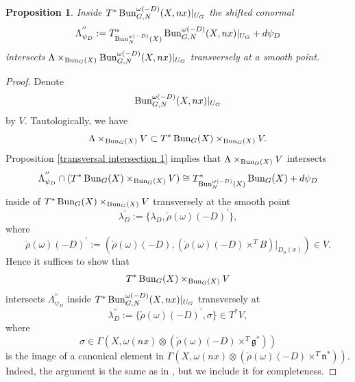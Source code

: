 \documentclass[9pt]{amsart}
\newtheorem{pr}[subsubsection]{Proposition}
\numberwithin{equation}{section}
\begin{document}
\begin{pr}\label{transversal intersection 2}
	Inside $T^*\operatorname{{Bun}}_{G, N}^{\omega(-D)}(X, nx)|_{U_G}$ the shifted conormal $$\Lambda^{''}_{\psi_D}:=T^*_{\operatorname{{Bun}}_N^{\omega(-D)}(X)} \operatorname{{Bun}}_{G, N}^{\omega(-D)}(X, nx)|_{U_G}+ d\psi_D$$
	intersects $\Lambda \times_{\operatorname{{Bun}}_G(X)} \operatorname{{Bun}}_{G, N}^{\omega(-D)}(X, nx)|_{U_G}$ transversely at a smooth point.
\end{pr}

\begin{proof}
	Denote $$\operatorname{{Bun}}_{G, N}^{\omega(-D)}(X, nx)|_{U_G}$$ by $V$. Tautologically, we have 
	$$\Lambda \times_{\operatorname{{Bun}}_G(X)}V \subset T^*\operatorname{{Bun}}_G(X) \times_{\operatorname{{Bun}}_G(X)} V.$$
	Proposition \ref{transversal intersection 1} implies that $\Lambda \times_{\operatorname{{Bun}}_G(X)} V$ intersects 
	$$\Lambda^{''}_{\psi_D} \cap (T^*\operatorname{{Bun}}_G(X) \times_{\operatorname{{Bun}}_G(X)} V) \cong T^*_{\operatorname{{Bun}}_N^{\omega(-D)}(X)} \operatorname{{Bun}}_{G}(X) + d\psi_D$$
	inside of $T^*\operatorname{{Bun}}_G(X) \times_{\operatorname{{Bun}}_G(X)} V$ transversely at the smooth point $$\lambda_D^{\prime}:= \{\lambda_D, \check{\rho}(\omega)(-D)^{\prime}\},$$
	where $$\check{\rho}(\omega)(-D)^{\prime}:=(\check{\rho}(\omega)(-D), (\check{\rho}(\omega)(-D)\times^T B) |_{D_n(x)}) \in V.$$Hence it suffices to show that $$T^*\operatorname{{Bun}}_G(X) \times_{\operatorname{{Bun}}_G(X)} V$$ intersects $\Lambda^{''}_{\psi_D}$ inside $T^*\operatorname{{Bun}}_{G, N}^{\omega(-D)}(X, nx)|_{U_G}$ transversely at 
	$$\lambda_D^{''}:= \{\check{\rho}(\omega)(-D)^{\prime}, \sigma\} \in  T^*V,$$
	where $$\sigma \in \Gamma(X, \omega(nx) \otimes (\check{\rho}(\omega)(-D) \times^T \mathfrak{g}^*))$$ is the image of a canonical element in $\Gamma(X, \omega(nx) \otimes (\check{\rho}(\omega)(-D) \times^T \mathfrak{n}^*))$.
	 Indeed, the argument is the same as in \cite[Proposition 3.3.2]{NT}, but we include it for completeness.


\end{proof}
\end{document}
